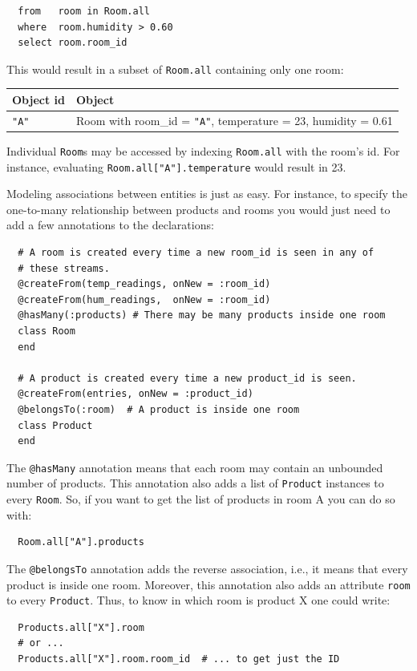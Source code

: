 \documentclass{report}
\begin{document}
\begin{lstlisting}
  from   room in Room.all
  where  room.humidity > 0.60
  select room.room_id
\end{lstlisting}

This would result in a subset of \verb=Room.all= containing only one
room:

\begin{tabular}{ |l|l| }
  \hline
  Object id & Object \\
  \hline
  \verb="A"= & Room with room\_id = \verb="A"=, temperature = 23, humidity = 0.61 \\
  \hline
\end{tabular}

Individual \verb=Room=s may be accessed by indexing \verb=Room.all=
with the room's id. For instance, evaluating
\verb=Room.all["A"].temperature= would result in 23.

Modeling associations between entities is just as easy. For instance,
to specify the one-to-many relationship between products and rooms you
would just need to add a few annotations to the declarations:

\begin{lstlisting}
  # A room is created every time a new room_id is seen in any of
  # these streams.
  @createFrom(temp_readings, onNew = :room_id)
  @createFrom(hum_readings,  onNew = :room_id)
  @hasMany(:products) # There may be many products inside one room
  class Room
  end

  # A product is created every time a new product_id is seen.
  @createFrom(entries, onNew = :product_id)
  @belongsTo(:room)  # A product is inside one room
  class Product
  end
\end{lstlisting}

The \verb=@hasMany= annotation means that each room may contain an
unbounded number of products. This annotation also adds a list of
\verb=Product= instances to every \verb=Room=. So, if you want to get
the list of products in room A you can do so with:

\begin{lstlisting}
  Room.all["A"].products
\end{lstlisting}

The \verb=@belongsTo= annotation adds the reverse association, i.e.,
it means that every product is inside one room. Moreover, this
annotation also adds an attribute \verb=room= to every
\verb=Product=. Thus, to know in which room is product X one could
write:

\begin{lstlisting}
  Products.all["X"].room
  # or ...
  Products.all["X"].room.room_id  # ... to get just the ID
\end{lstlisting}
\end{document}
